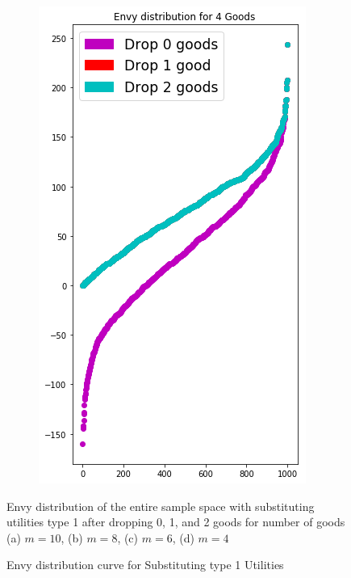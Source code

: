 \begin{figure}[h!]
\begin{subfigure}[b]{0.47\linewidth}
    \includegraphics[width=\linewidth]{images/envy_density/envy_density_us14.png}
    \caption{}
  \end{subfigure}
  \caption{Envy distribution curve for Substituting type 1 Utilities}
  \label{fig_efk_dist_curve_subst1}
  \small
    Envy distribution of the entire sample space with substituting utilities type 1 after dropping 0, 1, and 2 goods for number of goods (a) $m = 10$, (b) $m = 8$, (c) $m = 6$, (d) $m = 4$
\end{figure}

